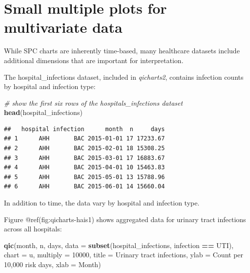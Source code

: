 \documentclass[
]{book}
\newenvironment{Shaded}{\begin{snugshade}}{\end{snugshade}}
\newcommand{\AttributeTok}[1]{\textcolor[rgb]{0.13,0.29,0.53}{#1}}
\newcommand{\CommentTok}[1]{\textcolor[rgb]{0.56,0.35,0.01}{\textit{#1}}}
\newcommand{\DecValTok}[1]{\textcolor[rgb]{0.00,0.00,0.81}{#1}}
\newcommand{\FunctionTok}[1]{\textcolor[rgb]{0.13,0.29,0.53}{\textbf{#1}}}
\newcommand{\NormalTok}[1]{#1}
\newcommand{\SpecialCharTok}[1]{\textcolor[rgb]{0.81,0.36,0.00}{\textbf{#1}}}
\newcommand{\StringTok}[1]{\textcolor[rgb]{0.31,0.60,0.02}{#1}}
\begin{document}
\section{Small multiple plots for multivariate
data}\label{small-multiple-plots-for-multivariate-data}

While SPC charts are inherently time-based, many healthcare datasets
include additional dimensions that are important for interpretation.

The hospital\_infections dataset, included in \emph{qicharts2}, contains
infection counts by hospital and infection type:

\begin{Shaded}
\begin{Highlighting}[]
\CommentTok{\# show the first six rows of the hospitals\_infections dataset}
\FunctionTok{head}\NormalTok{(hospital\_infections)}
\end{Highlighting}
\end{Shaded}

\begin{verbatim}
##   hospital infection      month  n     days
## 1      AHH       BAC 2015-01-01 17 17233.67
## 2      AHH       BAC 2015-02-01 18 15308.25
## 3      AHH       BAC 2015-03-01 17 16883.67
## 4      AHH       BAC 2015-04-01 10 15463.83
## 5      AHH       BAC 2015-05-01 13 15788.96
## 6      AHH       BAC 2015-06-01 14 15660.04
\end{verbatim}

In addition to time, the data vary by hospital and infection type.

Figure @ref(fig:qicharts-hais1) shows aggregated data for urinary tract
infections across all hospitals:

\begin{Shaded}
\begin{Highlighting}[]
\FunctionTok{qic}\NormalTok{(month, n, days, }
    \AttributeTok{data     =} \FunctionTok{subset}\NormalTok{(hospital\_infections,}
\NormalTok{                      infection }\SpecialCharTok{==} \StringTok{\textquotesingle{}UTI\textquotesingle{}}\NormalTok{),}
    \AttributeTok{chart    =} \StringTok{\textquotesingle{}u\textquotesingle{}}\NormalTok{,}
    \AttributeTok{multiply =} \DecValTok{10000}\NormalTok{,}
    \AttributeTok{title    =} \StringTok{\textquotesingle{}Urinary tract infections\textquotesingle{}}\NormalTok{,}
    \AttributeTok{ylab     =} \StringTok{\textquotesingle{}Count per 10,000 risk days\textquotesingle{}}\NormalTok{,}
    \AttributeTok{xlab     =} \StringTok{\textquotesingle{}Month\textquotesingle{}}\NormalTok{)}
\end{Highlighting}
\end{Shaded}
\end{document}
